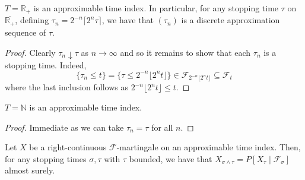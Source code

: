 \begin{lemma}\label{lem:stoppingTime_approximation}
  \leanok
  $T = \mathbb{R}_+$ is an approximable time index. In particular,
  for any stopping time $\tau$ on $\overline{\mathbb{R}_+}$, defining $\tau_n =  2^{-n} \lceil 2^n \tau \rceil$,
  we have that $(\tau_n)$ is a discrete approximation sequence of $\tau$.
\end{lemma}

\begin{proof}\leanok
  Clearly $\tau_n \downarrow \tau$ as $n \to \infty$ and so it remains to show that each $\tau_n$ is a stopping time.
  Indeed,
  \[\{\tau_n \le t\} = \{\tau \le 2^{-n} \lfloor 2^n t\rfloor\}
    \in \mathcal{F}_{2^{-n} \lfloor 2^n t\rfloor} \subseteq \mathcal{F}_t\]
  where the last inclusion follows as \(2^{-n} \lfloor 2^n t\rfloor \le t\).
\end{proof}

\begin{lemma}\label{lem:stoppingTime_approximationNat}
  \leanok
  $T = \mathbb{N}$ is an approximable time index.
\end{lemma}

\begin{proof}\leanok
  Immediate as we can take \(\tau_n = \tau\) for all \(n\).
\end{proof}

\begin{lemma}\label{lem:optionalSampling}
  \leanok
  Let $X$ be a right-continuous $\mathcal{F}$-martingale on an approximable time index. Then, for
  any stopping times $\sigma, \tau$ with $\tau$ bounded, we have that
  $X_{\sigma \wedge \tau} = P[X_{\tau} \mid \mathcal{F}_{\sigma}]$ almost surely.
\end{lemma}


